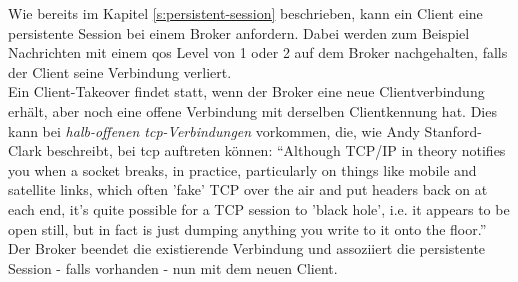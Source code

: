  \label{s:client-takeover}
Wie bereits im Kapitel \ref{s:persistent-session} beschrieben, kann ein Client eine persistente Session bei einem Broker anfordern. Dabei werden zum Beispiel Nachrichten mit einem \ac{qos} Level von 1 oder 2 auf dem Broker nachgehalten, falls der Client seine Verbindung verliert.
\\
Ein Client-Takeover findet statt, wenn der Broker eine neue Clientverbindung erhält, aber noch eine offene Verbindung mit derselben Clientkennung hat. Dies kann bei \textit{halb-offenen \acs{tcp}-Verbindungen} vorkommen, die, wie Andy Stanford-Clark beschreibt, bei \ac{tcp} auftreten können:\newline
``Although TCP/IP in theory notifies you when a socket breaks, in practice, particularly on things like mobile and satellite links, which often 'fake' TCP over the air and put headers back on at each end, it’s quite possible for a TCP session to 'black hole', i.e. it appears to be open still, but in fact is just dumping anything you write to it onto the floor.''\cite{WhyKeepaliveNeeded}\newline
Der Broker beendet die existierende Verbindung und assoziiert die persistente Session - falls vorhanden - nun mit dem neuen Client.
\cite{teamKeepAliveClient}
\newpage

